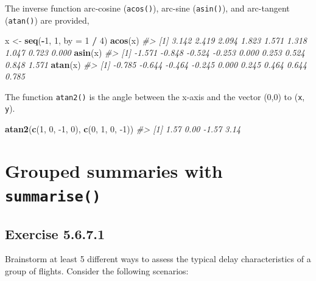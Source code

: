 \documentclass[]{book}
\newenvironment{Shaded}{\begin{snugshade}}{\end{snugshade}}
\newcommand{\CommentTok}[1]{\textcolor[rgb]{0.56,0.35,0.01}{\textit{#1}}}
\newcommand{\DataTypeTok}[1]{\textcolor[rgb]{0.13,0.29,0.53}{#1}}
\newcommand{\DecValTok}[1]{\textcolor[rgb]{0.00,0.00,0.81}{#1}}
\newcommand{\KeywordTok}[1]{\textcolor[rgb]{0.13,0.29,0.53}{\textbf{#1}}}
\newcommand{\NormalTok}[1]{#1}
\newcommand{\OperatorTok}[1]{\textcolor[rgb]{0.81,0.36,0.00}{\textbf{#1}}}
\newcommand{\StringTok}[1]{\textcolor[rgb]{0.31,0.60,0.02}{#1}}
\theoremstyle{plain}
\theoremstyle{remark}
\begin{document}
The inverse function arc-cosine (\texttt{acos()}), arc-sine (\texttt{asin()}), and arc-tangent (\texttt{atan()}) are provided,

\begin{Shaded}
\begin{Highlighting}[]
\NormalTok{x <-}\StringTok{ }\KeywordTok{seq}\NormalTok{(}\OperatorTok{-}\DecValTok{1}\NormalTok{, }\DecValTok{1}\NormalTok{, }\DataTypeTok{by =} \DecValTok{1} \OperatorTok{/}\StringTok{ }\DecValTok{4}\NormalTok{)}
\KeywordTok{acos}\NormalTok{(x)}
\CommentTok{#> [1] 3.142 2.419 2.094 1.823 1.571 1.318 1.047 0.723 0.000}
\KeywordTok{asin}\NormalTok{(x)}
\CommentTok{#> [1] -1.571 -0.848 -0.524 -0.253  0.000  0.253  0.524  0.848  1.571}
\KeywordTok{atan}\NormalTok{(x)}
\CommentTok{#> [1] -0.785 -0.644 -0.464 -0.245  0.000  0.245  0.464  0.644  0.785}
\end{Highlighting}
\end{Shaded}

The function \texttt{atan2()} is the angle between the x-axis and the vector (0,0) to (\texttt{x}, \texttt{y}).

\begin{Shaded}
\begin{Highlighting}[]
\KeywordTok{atan2}\NormalTok{(}\KeywordTok{c}\NormalTok{(}\DecValTok{1}\NormalTok{, }\DecValTok{0}\NormalTok{, }\DecValTok{-1}\NormalTok{, }\DecValTok{0}\NormalTok{), }\KeywordTok{c}\NormalTok{(}\DecValTok{0}\NormalTok{, }\DecValTok{1}\NormalTok{, }\DecValTok{0}\NormalTok{, }\DecValTok{-1}\NormalTok{))}
\CommentTok{#> [1]  1.57  0.00 -1.57  3.14}
\end{Highlighting}
\end{Shaded}

\hypertarget{grouped-summaries-with-summarise}{%
\section{\texorpdfstring{Grouped summaries with \texttt{summarise()}}{Grouped summaries with summarise()}}\label{grouped-summaries-with-summarise}}

\hypertarget{exercise-5.6.7.1}{%
\subsection*{\texorpdfstring{Exercise {5.6.7.1}}{Exercise 5.6.7.1}}\label{exercise-5.6.7.1}}

Brainstorm at least 5 different ways to assess the typical delay characteristics of a group of flights. Consider the following scenarios:
\end{document}
